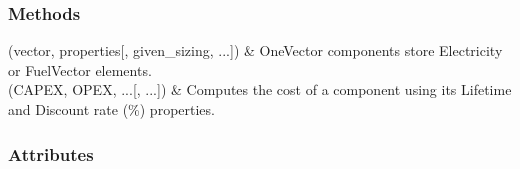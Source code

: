 \documentclass[letterpaper,10pt,english]{sphinxmanual}
\begin{document}
\begin{fulllineitems}
\begin{fulllineitems}
\begin{quote}
\begin{description}
\begin{itemize}
\end{itemize}

\end{description}\end{quote}

\end{fulllineitems}

\subsubsection*{Methods}


\begin{savenotes}\sphinxattablestart
\centering
\begin{tabulary}{\linewidth}[t]{}
\hline

\sphinxAtStartPar
{\hyperref[\detokenize{generated/tamos.storage.OneVector:tamos.storage.OneVector.__init__}]{}}(vector, properties{[}, given\_sizing, ...{]})
&
\sphinxAtStartPar
OneVector components store Electricity or FuelVector elements.
\\
\hline
\sphinxAtStartPar
{\hyperref[\detokenize{generated/tamos.storage.OneVector:tamos.storage.OneVector.compute_actualized_cost}]{}}(CAPEX, OPEX, ...{[}, ...{]})
&
\sphinxAtStartPar
Computes the cost of a component using its \textquotesingle{}Lifetime\textquotesingle{} and \textquotesingle{}Discount rate (\%)\textquotesingle{} properties.
\\
\hline
\end{tabulary}
\par
\sphinxattableend\end{savenotes}
\subsubsection*{Attributes}


\begin{savenotes}\sphinxattablestart
\centering
\begin{tabulary}{\linewidth}[t]{}
\hline


\end{tabulary}
\end{savenotes}
\end{fulllineitems}
\end{document}
